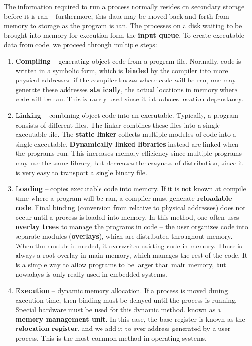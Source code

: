 The information required to run a process normally resides on secondary storage before it is ran -- furthermore, this data may be moved back and forth from memory to storage as the program is ran. The processes on a disk waiting to be brought into memory for execution form the {\bf input queue}. To create executable data from code, we proceed through multiple steps:
%
\begin{enumerate}
    \item {\bf Compiling} -- generating object code from a program file. Normally, code is written in a symbolic form, which is {\bf binded} by the compiler into more physical addresses. if the compiler knows where code will be ran, one may generate these addresses {\bf statically}, the actual locations in memory where code will be ran. This is rarely used since it introduces location dependancy.
    \item {\bf Linking} -- combining object code into an executable. Typically, a program consists of different files. The linker combines these files into a single executable file. The {\bf static linker} collects multiple modules of code into a single executable. {\bf Dynamically linked libraries} instead are linked when the programs run. This increases memory efficiency since multiple programs may use the same library, but decreases the easyness of distribution, since it is very easy to transport a single binary file.
    \item {\bf Loading} -- copies executable code into memory. If it is not known at compile time where a program will be ran, a compiler must generate {\bf reloadable code}. Final binding (conversion from relative to physical addresses) does not occur until a process is loaded into memory. In this method, one often uses {\bf overlay trees} to manage the programs in code -- the user organizes code into separate modules ({\bf overlays}), which are distributed throughout memory. When the module is needed, it overwrites existing code in memory. There is always a root overlay in main memory, which manages the rest of the code. It is a simple way to allow programs to be larger than main memory, but nowadays is only really used in embedded systems.
    \item {\bf Execution} -- dynamic memory allocation. If a process is moved during execution time, then binding must be delayed until the process is running. Special hardware must be used for this dynamic method, known as a {\bf memory management unit}. In this case, the base register is known as the {\bf relocation register}, and we add it to ever address generated by a user process. This is the most common method in operating systems.
\end{enumerate}

